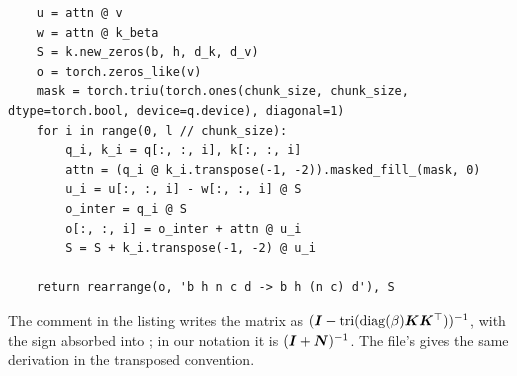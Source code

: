 \begin{sloppypar}
\begin{lstlisting}
    u = attn @ v
    w = attn @ k_beta
    S = k.new_zeros(b, h, d_k, d_v)
    o = torch.zeros_like(v)
    mask = torch.triu(torch.ones(chunk_size, chunk_size, dtype=torch.bool, device=q.device), diagonal=1)
    for i in range(0, l // chunk_size):
        q_i, k_i = q[:, :, i], k[:, :, i]
        attn = (q_i @ k_i.transpose(-1, -2)).masked_fill_(mask, 0)
        u_i = u[:, :, i] - w[:, :, i] @ S
        o_inter = q_i @ S
        o[:, :, i] = o_inter + attn @ u_i
        S = S + k_i.transpose(-1, -2) @ u_i

    return rearrange(o, 'b h n c d -> b h (n c) d'), S
\end{lstlisting}

The comment in the listing writes the matrix as $(\bm{I}-\mathrm{tri}(\operatorname{diag}(\beta)\bm{K}\bm{K}^{\top}))^{-1}$,
with the sign absorbed into ; in our notation it is $(\bm{I}+\bm{N})^{-1}$. The file's
 gives the same derivation in the transposed convention.


\end{sloppypar}
